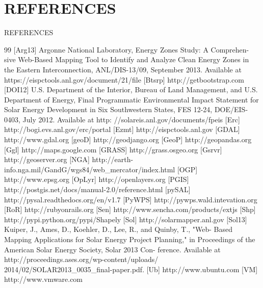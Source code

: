 \documentclass[svgnames,9pt]{beamer}
\begin{document}
\section{REFERENCES}
\begin{frame}{REFERENCES}

\begin{thebibliography}{99}
            [Arg13] Argonne National Laboratory, Energy Zones Study: A Comprehen-
sive Web-Based Mapping Tool to Identify and Analyze Clean Energy
Zones in the Eastern Interconnection, ANL/DIS-13/09, September
2013. Available at https://eispctools.anl.gov/document/21/file
[Btsrp] http://getbootstrap.com
[DOI12] U.S. Department of the Interior, Bureau of Land Management,
and U.S. Department of Energy, Final Programmatic Environmental
Impact Statement for Solar Energy Development in Six Southwestern
States, FES 12-24, DOE/EIS-0403, July 2012. Available at http:
//solareis.anl.gov/documents/fpeis
[Erc] http://bogi.evs.anl.gov/erc/portal
[Ezmt] http://eispctools.anl.gov
[GDAL] http://www.gdal.org
[geoD] http://geodjango.org
[GeoP] http://geopandas.org
[Ggl] http://maps.google.com
[GRASS] http://grass.osgeo.org
[Gsrvr] http://geoserver.org
[NGA] http://earth-info.nga.mil/GandG/wgs84/web_mercator/index.html
[OGP] http://www.epsg.org
[OpLyr] http://openlayers.org
[PGIS] http://postgis.net/docs/manual-2.0/reference.html
[pySAL] http://pysal.readthedocs.org/en/v1.7
[PyWPS] http://pywps.wald.intevation.org
[RoR] http://rubyonrails.org
[Sen] http://www.sencha.com/products/extjs
[Shp] http://pypi.python.org/pypi/Shapely
[Sol] http://solarmapper.anl.gov
[Sol13] Kuiper, J., Ames, D., Koehler, D., Lee, R., and Quinby, T., "Web-
Based Mapping Applications for Solar Energy Project Planning," in
Proceedings of the American Solar Energy Society, Solar 2013 Con-
ference. Available at http://proceedings.ases.org/wp-content/uploads/
2014/02/SOLAR2013_0035_final-paper.pdf.
[Ub] http://www.ubuntu.com
[VM] http://www.vmware.com
\end{thebibliography}
\end{frame}
\end{document}
